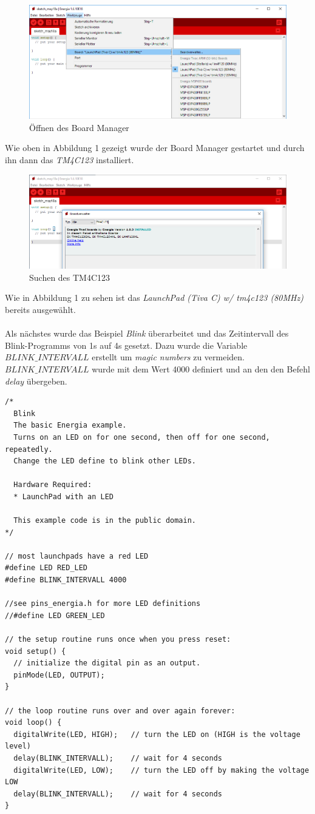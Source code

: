 \begin{figure}[h]
	\centering
	\includegraphics[width=0.7\linewidth]{images/addTM4C123}
	\caption{Öffnen des Board Manager}
	\label{fig:addTM4C123}
\end{figure}
\noindent Wie oben in Abbildung 1 gezeigt wurde der Board Manager gestartet und durch ihn dann das \textit{TM4C123} installiert.
\newpage
\begin{figure}[h]
	\centering
	\includegraphics[width=0.7\linewidth]{images/addTM4C123(2)}
	\caption{Suchen des TM4C123}
	\label{fig:addTM4C123(2)}
\end{figure}
\noindent Wie in Abbildung 1 zu sehen ist das \textit{LaunchPad (Tiva C) w/ tm4c123 (80MHz)} bereits ausgewählt.\\ \\
Als nächstes wurde das Beispiel \textit{Blink} überarbeitet und das Zeitintervall des Blink-Programms von 1s auf 4s gesetzt. Dazu wurde die Variable $BLINK\_INTERVALL$ erstellt um \textit{magic numbers} zu vermeiden. $BLINK\_INTERVALL$ wurde mit dem Wert 4000 definiert und an den den Befehl \textit{delay} übergeben.
\begin{lstlisting}[label=lst:bash]
/*
  Blink
  The basic Energia example.
  Turns on an LED on for one second, then off for one second, repeatedly.
  Change the LED define to blink other LEDs.
  
  Hardware Required:
  * LaunchPad with an LED
  
  This example code is in the public domain.
*/

// most launchpads have a red LED
#define LED RED_LED
#define BLINK_INTERVALL 4000

//see pins_energia.h for more LED definitions
//#define LED GREEN_LED
  
// the setup routine runs once when you press reset:
void setup() {                
  // initialize the digital pin as an output.
  pinMode(LED, OUTPUT);     
}

// the loop routine runs over and over again forever:
void loop() {
  digitalWrite(LED, HIGH);   // turn the LED on (HIGH is the voltage level)
  delay(BLINK_INTERVALL);    // wait for 4 seconds
  digitalWrite(LED, LOW);    // turn the LED off by making the voltage LOW
  delay(BLINK_INTERVALL);    // wait for 4 seconds
}
\end{lstlisting}
